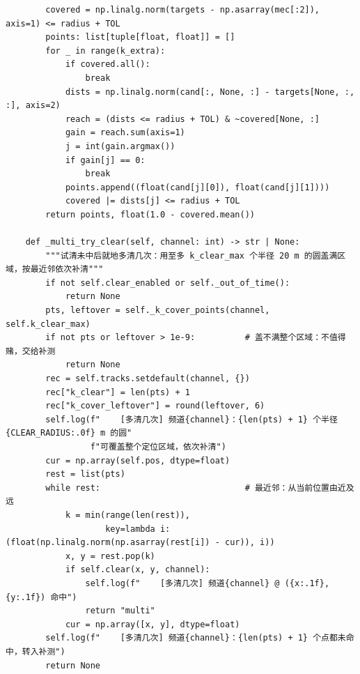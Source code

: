 \documentclass[UTF8, zihao=5,AutoFakeBold=2]{ctexart}
\begin{document}
\begin{lstlisting}
        covered = np.linalg.norm(targets - np.asarray(mec[:2]), axis=1) <= radius + TOL
        points: list[tuple[float, float]] = []
        for _ in range(k_extra):
            if covered.all():
                break
            dists = np.linalg.norm(cand[:, None, :] - targets[None, :, :], axis=2)
            reach = (dists <= radius + TOL) & ~covered[None, :]
            gain = reach.sum(axis=1)
            j = int(gain.argmax())
            if gain[j] == 0:
                break
            points.append((float(cand[j][0]), float(cand[j][1])))
            covered |= dists[j] <= radius + TOL
        return points, float(1.0 - covered.mean())

    def _multi_try_clear(self, channel: int) -> str | None:
        """试清未中后就地多清几次：用至多 k_clear_max 个半径 20 m 的圆盖满区域，按最近邻依次补清"""
        if not self.clear_enabled or self._out_of_time():
            return None
        pts, leftover = self._k_cover_points(channel, self.k_clear_max)
        if not pts or leftover > 1e-9:          # 盖不满整个区域：不值得赌，交给补测
            return None
        rec = self.tracks.setdefault(channel, {})
        rec["k_clear"] = len(pts) + 1
        rec["k_cover_leftover"] = round(leftover, 6)
        self.log(f"    [多清几次] 频道{channel}：{len(pts) + 1} 个半径 {CLEAR_RADIUS:.0f} m 的圆"
                 f"可覆盖整个定位区域，依次补清")
        cur = np.array(self.pos, dtype=float)
        rest = list(pts)
        while rest:                             # 最近邻：从当前位置由近及远
            k = min(range(len(rest)),
                    key=lambda i: (float(np.linalg.norm(np.asarray(rest[i]) - cur)), i))
            x, y = rest.pop(k)
            if self.clear(x, y, channel):
                self.log(f"    [多清几次] 频道{channel} @ ({x:.1f}, {y:.1f}) 命中")
                return "multi"
            cur = np.array([x, y], dtype=float)
        self.log(f"    [多清几次] 频道{channel}：{len(pts) + 1} 个点都未命中，转入补测")
        return None


\end{lstlisting}
\end{document}
